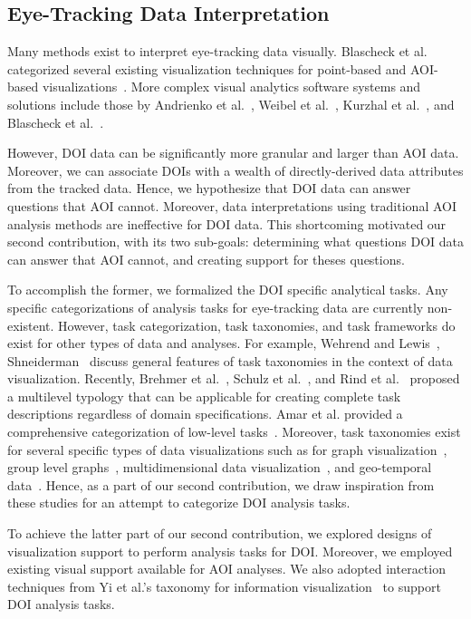 \subsection{Eye-Tracking Data Interpretation}
Many methods exist to interpret eye-tracking data visually. Blascheck et al. categorized several existing visualization techniques for point-based and AOI-based visualizations~\cite{Bla14}. More complex visual analytics software systems and solutions include those by Andrienko et al.~\cite{And12}, Weibel et al.~\cite{Wei12}, Kurzhal et al.~\cite{Kur14}, and Blascheck et al.~\cite{Bla16}.

However, DOI data can be significantly more granular and larger than AOI data. Moreover, we can associate DOIs with a wealth of directly-derived data attributes from the tracked data. Hence, we hypothesize that DOI data can answer questions that AOI cannot. Moreover, data interpretations using traditional AOI analysis methods are ineffective for DOI data. This shortcoming motivated our second contribution, with its two sub-goals: determining what questions DOI data can answer that AOI cannot, and creating support for theses questions. 
 
To accomplish the former, we formalized the DOI specific analytical tasks. Any specific categorizations of analysis tasks for eye-tracking data are currently non-existent. However, task categorization, task taxonomies, and task frameworks do exist for other types of data and analyses. For example, Wehrend and Lewis~\cite{Weh90}, Shneiderman~\cite{Shne96} discuss general features of task taxonomies in the context of data visualization. Recently, Brehmer et al.~\cite{Bre13}, Schulz et al.~\cite{Sch13}, and Rind et al.~\cite{Rind15} proposed a multilevel typology that can be applicable for creating complete task descriptions regardless of domain specifications. Amar et al. provided a comprehensive categorization of low-level tasks~\cite{Ama05}. Moreover, task taxonomies exist for several specific types of data visualizations such as for graph visualization~\cite{Lee06}, group level graphs~\cite{Sak14}, multidimensional data visualization~\cite{Ward02}, and geo-temporal data~\cite{And03, Roth13}. Hence, as a part of our second contribution, we draw inspiration from these studies for an attempt to categorize DOI analysis tasks. 

To achieve the latter part of our second contribution, we explored designs of visualization support to perform analysis tasks for DOI. Moreover, we employed existing visual support available for AOI analyses. We also adopted interaction techniques from Yi et al.'s taxonomy for information visualization~\cite{Yi07} to support DOI analysis tasks.  
